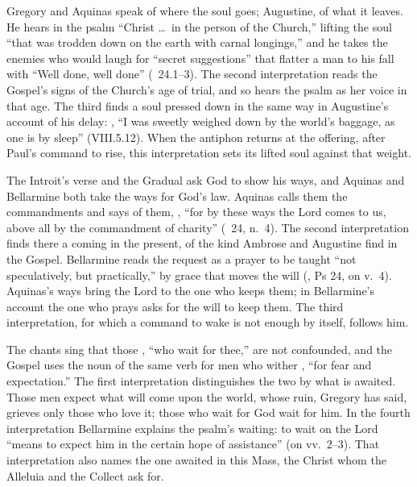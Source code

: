 Gregory and Aquinas speak of where the soul goes; Augustine, of what it
leaves. He hears in the psalm ``Christ \dots\ in the person of the Church,''
lifting the soul ``that was trodden down
on the earth with carnal longings,'' and he takes the enemies who would laugh
for ``secret suggestions'' that flatter a man to his fall with ``Well done,
well done'' (~24.1--3). The second interpretation reads the
Gospel's signs of the Church's age of trial, and so hears the psalm as her
voice in that age. The third finds a soul pressed down in the same way in
Augustine's account of his delay: , ``I was sweetly weighed down by the world's baggage, as one is by sleep''
(VIII.5.12). When the antiphon returns at the offering, after Paul's command
to rise, this interpretation sets its lifted soul against that weight.

The Introit's verse and the Gradual ask God to show his ways, and Aquinas and
Bellarmine both take the ways for God's law. Aquinas calls them the
commandments and says of them, , ``for by these ways the Lord comes to us,
above all by the commandment of charity'' (~24, n.~4). The
second interpretation finds there a coming in the present, of the kind
Ambrose and Augustine find in the Gospel. Bellarmine reads the request as a
prayer to be taught ``not speculatively, but practically,'' by grace that
moves the will (, Ps 24, on v.~4). Aquinas's ways bring
the Lord to the one who keeps them; in Bellarmine's account the one who prays
asks for the will to keep them. The third interpretation, for which a command to wake is not enough by itself, follows
him.

The chants sing that those , ``who wait for thee,''
are not confounded, and the Gospel uses the noun of the same verb for men who
wither , ``for fear and expectation.'' The
first interpretation distinguishes the two by what is awaited. Those men
expect what will come upon the world, whose ruin, Gregory has said, grieves
only those who love it; those who wait for God wait for him. In the fourth
interpretation Bellarmine explains the psalm's waiting: to wait on the Lord
``means to expect him in the certain hope of assistance'' (on vv.~2--3). That
interpretation also names the one awaited in this Mass, the Christ whom the
Alleluia and the Collect ask for.

